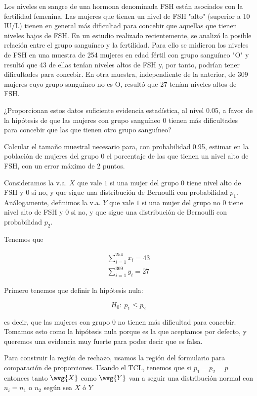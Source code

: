 \begin{problem}[4] Los niveles en sangre de una hormona denominada FSH están asociados con la fertilidad femenina. Las mujeres que tienen un nivel de FSH "alto" (superior a 10 IU/L) tienen en general más dificultad para concebir que aquellas que tienen niveles bajos de FSH. En un estudio realizado recientemente, se analizó la posible relación entre el grupo sanguíneo y la fertilidad. Para ello se midieron los niveles de FSH en una muestra de 254 mujeres en edad fértil con grupo sanguíneo "O" y resultó que 43 de ellas tenían niveles altos de FSH y, por tanto, podrían tener dificultades para concebir. En otra muestra, independiente de la anterior, de 309 mujeres cuyo grupo sanguíneo no es O, resultó que 27 tenían niveles altos de FSH. 

\ppart ¿Proporcionan estos datos suficiente evidencia estadística, al nivel 0.05, a favor de la hipótesis de que las mujeres con grupo sanguíneo 0 tienen más dificultades para concebir que las que tienen otro grupo sanguíneo?

\ppart Calcular el tamaño muestral necesario para, con probabilidad 0.95, estimar en la población de mujeres del grupo 0 el porcentaje de las que tienen un nivel alto de FSH, con un error máximo de 2 puntos.

\solution

Consideramos la v.a. $X$ que vale $1$ si una mujer del grupo 0 tiene nivel alto de FSH y 0 si no, y que sigue una distribución de Bernoulli con probabilidad $p_1$. Análogamente, definimos la v.a. $Y$ que vale $1$ si una mujer del grupo no 0 tiene nivel alto de FSH y 0 si no, y que sigue una distribución de Bernoulli con probabilidad $p_2$.

Tenemos que 

\begin{gather*}
\sum_{i=1}^{254} x_i = 43 \\
\sum_{i=1}^{309} y_i = 27 
\end{gather*}

\spart Primero tenemos que definir la hipótesis nula:

\[ H_0:\: p_1≤p_2 \]

es decir, que las mujeres con grupo 0 no tienen más dificultad para concebir. Tomamos esto como la hipótesis nula porque es la que aceptamos por defecto, y queremos una evidencia muy fuerte para poder decir que es falsa.

Para construir la región de rechazo, usamos la región del formulario para comparación de proporciones. Usando el TCL, tenemos que si $p_1=p_2=p$ entonces tanto $\avg{X}$ como $\avg{Y}$ van a seguir una distribución normal con $n_i = n_1$ o $n_2$ según sea $X$ ó $Y$


\end{problem}

